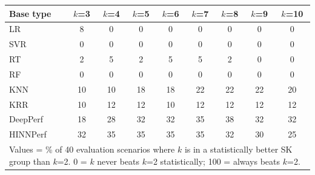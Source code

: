 \begin{tabular}{lcccccccc}
\toprule
Base type & $k$=3 & $k$=4 & $k$=5 & $k$=6 & $k$=7 & $k$=8 & $k$=9 & $k$=10 \\
\midrule
LR & 8 & 0 & 0 & 0 & 0 & 0 & 0 & 0 \\
SVR & 0 & 0 & 0 & 0 & 0 & 0 & 0 & 0 \\
RT & 2 & 5 & 2 & 5 & 5 & 2 & 0 & 0 \\
RF & 0 & 0 & 0 & 0 & 0 & 0 & 0 & 0 \\
KNN & 10 & 10 & 18 & 18 & 22 & 22 & 22 & 20 \\
KRR & 10 & 12 & 12 & 10 & 12 & 12 & 12 & 12 \\
DeepPerf & 18 & 28 & 32 & 32 & 35 & 38 & 32 & 32 \\
HINNPerf & 32 & 35 & 35 & 35 & 35 & 32 & 30 & 25 \\
\bottomrule
\multicolumn{9}{l}{\footnotesize Values = \% of 40 evaluation scenarios where $k$ is in a statistically better SK group than $k$=2. 0 = $k$ never beats $k$=2 statistically; 100 = always beats $k$=2.}} \\
\end{tabular}
